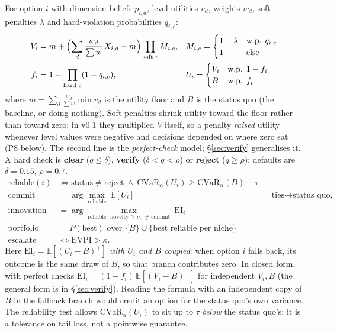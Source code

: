 \documentclass[11pt]{article}
\theoremstyle{definition}
\begin{document}
For option $i$ with dimension beliefs $p_{i,d}$, level utilities $v_d$, weights $w_d$, soft
penalties $\lambda$ and hard-violation probabilities $q_{i,c}$:
\begin{align*}
V_i &= m+\Bigl(\sum_d \frac{w_d}{\sum w}\,X_{i,d}-m\Bigr) \prod_{\text{soft }c} M_{i,c},
&& M_{i,c}=\begin{cases}1-\lambda &\text{w.p. }q_{i,c}\\1&\text{else}\end{cases}\\
f_i &= 1-\prod_{\text{hard }c}(1-q_{i,c}),
&& U_i=\begin{cases}V_i &\text{w.p. }1-f_i\\ B &\text{w.p. }f_i\end{cases}
\end{align*}
where $m=\sum_d\frac{w_d}{\sum w}\min v_d$ is the utility floor and $B$ is the status quo (the
baseline, or doing nothing). Soft penalties shrink utility toward the floor rather than toward
zero; in v0.1 they multiplied $V$ itself, so a penalty \emph{raised} utility whenever level values
were negative and decisions depended on where zero sat (P8 below). The second line is the
\emph{perfect-check} model; \S\ref{sec:verify} generalises it. A hard check is \textbf{clear}
($q\le\delta$), \textbf{verify} ($\delta<q<\rho$) or \textbf{reject} ($q\ge\rho$); defaults are
$\delta=0.15$, $\rho=0.7$.
\begin{align}
\text{reliable}(i) &\iff \mathrm{status}\neq\mathrm{reject}
\ \land\ \mathrm{CVaR}_\alpha(U_i)\ge \mathrm{CVaR}_\alpha(B)-\tau \\
\text{commit} &= \arg\max_{\text{reliable}}\ \mathbb{E}[U_i]
&& \text{ties}\to\text{status quo, then id} \\
\text{innovation} &= \arg\max_{\text{reliable},\ \mathrm{novelty}\ge\nu,\ \neq\text{commit}}
\ \mathrm{EI}_i \\
\text{portfolio} &= P(\mathrm{best})\text{ over }\{B\}\cup\{\text{best reliable per niche}\} \\
\text{escalate} &\iff \mathrm{EVPI}>\kappa .
\end{align}
Here $\mathrm{EI}_i=\mathbb E[(U_i-B)^+]$ \emph{with $U_i$ and $B$ coupled}: when option $i$ falls back,
its outcome is the same draw of $B$, so that branch contributes zero. In closed form, with
perfect checks $\mathrm{EI}_i=(1-f_i)\,\mathbb E[(V_i-B)^+]$ for independent $V_i,B$ (the general
form is in \S\ref{sec:verify}). Reading the formula with an independent copy of $B$ in the
fallback branch would credit an option for the status quo's own variance.
The reliability test allows $\mathrm{CVaR}_\alpha(U_i)$ to sit up to $\tau$ \emph{below} the status
quo's: it is a tolerance on tail loss, not a pointwise guarantee.
\end{document}
